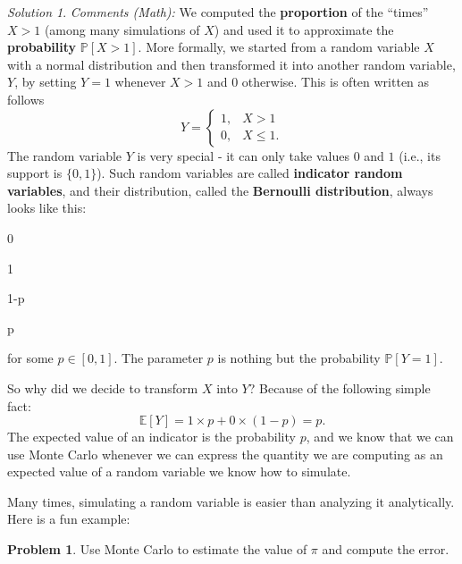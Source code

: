 \documentclass[
]{book}
\theoremstyle{definition}
\theoremstyle{definition}
\theoremstyle{definition}
\newtheorem{exercise}{Problem}[chapter]
\theoremstyle{definition}
\theoremstyle{remark}
\newtheorem*{solution}{Solution}
\begin{document}
\begin{solution}
\emph{Comments (Math):} We computed the \textbf{proportion} of the ``times'' \(X>1\) (among many simulations of \(X\)) and used it to approximate the \textbf{probability} \({\mathbb{P}}[ X>1]\). More formally,
we started from a random variable \(X\) with a normal distribution and then transformed it into another random variable, \(Y\), by setting \(Y=1\) whenever \(X>1\) and \(0\) otherwise. This is often written as follows
\[ Y = \begin{cases} 1, & X>1 \\ 0, & X\leq 1.\end{cases}\]
The random variable \(Y\) is very special - it can only take values \(0\) and \(1\) (i.e., its support is \(\{0,1\}\)). Such random variables are called \textbf{indicator random variables}, and their distribution, called the \textbf{Bernoulli distribution}, always looks like this:

0

1

1-p

p

for some \(p \in [0,1]\). The parameter \(p\) is nothing but the probability \({\mathbb{P}}[Y=1]\).

So why did we decide to transform \(X\) into \(Y\)? Because of the following simple fact:
\[ {\mathbb{E}}[ Y] = 1 \times p + 0 \times (1-p) = p.\]
The expected value of an indicator is the probability \(p\), and we know that we can use Monte Carlo whenever we can express the quantity we are computing as an expected value of a random variable we know how to simulate.
\end{solution}

Many times, simulating a random variable is easier than analyzing it analytically. Here is a fun example:

\begin{exercise}
Use Monte Carlo to estimate the value of \(\pi\) and compute the error.
\end{exercise}
\end{document}
